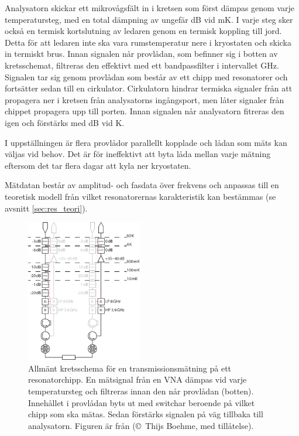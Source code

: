 \documentclass[main.tex]{subfiles}
\begin{document}
Analysatorn skickar ett mikrovågsfält in i kretsen som först dämpas genom varje temperatursteg, med en total dämpning av ungefär \unit[67]{dB} vid \unit[10]{mK}. I varje steg sker också en termisk kortslutning av ledaren genom en termisk koppling till jord. Detta för att ledaren inte ska vara rumstemperatur nere i kryostaten och skicka in termiskt brus. Innan signalen når provlådan, som befinner sig i botten av kretsschemat, filtreras den effektivt med ett bandpassfilter i intervallet \unit[4-8]{GHz}. Signalen tar sig genom provlådan som består av ett chipp med resonatorer och fortsätter sedan till en cirkulator. Cirkulatorn hindrar termiska signaler från att propagera ner i kretsen från analysatorns ingångsport, men låter signaler från chippet propagera upp till porten. Innan signalen når analysatorn fitreras den igen och förstärks med \unit[35-40]{dB} vid \unit[4]{K}.

I uppställningen är flera provlådor parallellt kopplade och lådan som mäts kan väljas vid behov. Det är för ineffektivt att byta låda mellan varje mätning eftersom det tar flera dagar att kyla ner kryostaten.

Mätdatan består av amplitud- och fasdata över frekvens och anpassas till en teoretisk modell från vilket resonatorernas karakteristik kan bestämmas (se avsnitt \ref{sec:res_teori}).

\begin{figure}[H]
    \centering
    \includegraphics[width=0.45\textwidth]{figure/kretsar/cryo.pdf}
    \caption{Allmänt kretsschema för en transmissionsmätning på ett resonatorchipp.
    En mätsignal från en VNA dämpas vid varje temperatursteg och filtreras innan den når provlådan (botten). Innehållet i provlådan byts ut med switchar beroende på vilket chipp som ska mätas. Sedan förstärks signalen på väg tillbaka till analysatorn. Figuren är från \cite{Boehme2016} (\copyright ~Thijs Boehme, med tillåtelse).}
    \label{fig:matuppstallning}
\end{figure}
\end{document}
